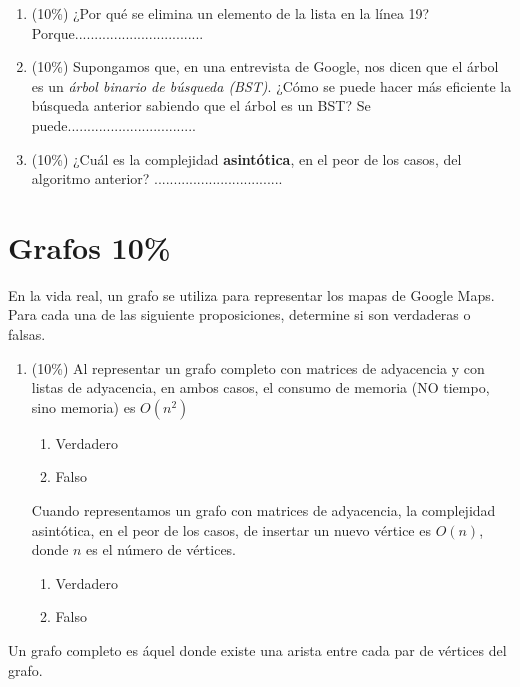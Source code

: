 \documentclass[10 pt]{article}
\begin{document}
\begin{multicols}{2}
\begin{enumerate}[label=\Alph*]
	\item (10\%) ¿Por qué se elimina un elemento de la lista en la línea 19? Porque.................................
	\item (10\%) Supongamos que, en una entrevista de Google, nos dicen que el árbol es un \emph{árbol binario de búsqueda (BST)}. ¿Cómo se puede hacer más eficiente la búsqueda anterior sabiendo que el árbol es un BST? Se puede.................................
	\item (10\%) ¿Cuál es la complejidad \textbf{asintótica}, en el peor de los casos, del algoritmo anterior? .................................
\end{enumerate}

\section{Grafos 10\%}
En la vida real, un grafo se utiliza para representar los mapas de Google Maps. 
Para cada una de las siguiente proposiciones, determine si son verdaderas o falsas.
\begin{enumerate}[label=\Alph*]
	\item (10\%) Al representar un grafo completo con matrices de adyacencia y con listas de adyacencia, en ambos casos, el consumo de memoria (NO tiempo, sino memoria) es $O(n^2)$
	\begin{enumerate}
		\item Verdadero
		\item Falso
	\end{enumerate}
	Cuando representamos un grafo con matrices de adyacencia, la complejidad asintótica, en el peor de los casos, de insertar un nuevo vértice es $O(n)$,  donde $n$ es el número de vértices.
	\begin{enumerate}
		\item Verdadero
		\item Falso
	\end{enumerate}
\end{enumerate}

Un grafo completo es áquel donde existe una arista entre cada par de vértices del grafo. 
\end{multicols}
\end{document}
